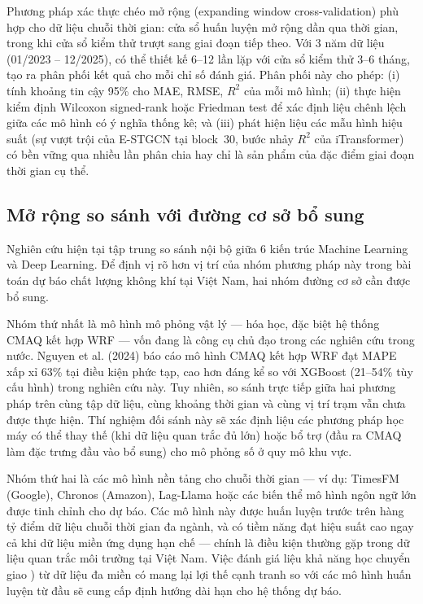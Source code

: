 Phương pháp xác thực chéo mở rộng (expanding window cross-validation) phù hợp cho dữ liệu chuỗi thời gian: cửa sổ huấn luyện mở rộng dần qua thời gian, trong khi cửa sổ kiểm thử trượt sang giai đoạn tiếp theo. Với 3 năm dữ liệu (01/2023 -- 12/2025), có thể thiết kế 6--12 lần lặp với cửa sổ kiểm thử 3--6 tháng, tạo ra phân phối kết quả cho mỗi chỉ số đánh giá. Phân phối này cho phép: (i) tính khoảng tin cậy 95\% cho MAE, RMSE, $R^2$ của mỗi mô hình; (ii) thực hiện kiểm định Wilcoxon signed-rank hoặc Friedman test để xác định liệu chênh lệch giữa các mô hình có ý nghĩa thống kê; và (iii) phát hiện liệu các mẫu hình hiệu suất (sự vượt trội của E-STGCN tại block~30, bước nhảy $R^2$ của iTransformer) có bền vững qua nhiều lần phân chia hay chỉ là sản phẩm của đặc điểm giai đoạn thời gian cụ thể.

\subsection{Mở rộng so sánh với đường cơ sở bổ sung}

Nghiên cứu hiện tại tập trung so sánh nội bộ giữa 6 kiến trúc Machine Learning và Deep Learning. Để định vị rõ hơn vị trí của nhóm phương pháp này trong bài toán dự báo chất lượng không khí tại Việt Nam, hai nhóm đường cơ sở cần được bổ sung.

Nhóm thứ nhất là mô hình mô phỏng vật lý --- hóa học, đặc biệt hệ thống CMAQ kết hợp WRF --- vốn đang là công cụ chủ đạo trong các nghiên cứu trong nước. Nguyen et al. (2024) báo cáo mô hình CMAQ kết hợp WRF đạt MAPE xấp xỉ 63\% tại điều kiện phức tạp, cao hơn đáng kể so với XGBoost (21--54\% tùy cấu hình) trong nghiên cứu này. Tuy nhiên, so sánh trực tiếp giữa hai phương pháp trên cùng tập dữ liệu, cùng khoảng thời gian và cùng vị trí trạm vẫn chưa được thực hiện. Thí nghiệm đối sánh này sẽ xác định liệu các phương pháp học máy có thể thay thế (khi dữ liệu quan trắc đủ lớn) hoặc bổ trợ (đầu ra CMAQ làm đặc trưng đầu vào bổ sung) cho mô phỏng số ở quy mô khu vực.

Nhóm thứ hai là các mô hình nền tảng cho chuỗi thời gian --- ví dụ: TimesFM (Google), Chronos (Amazon), Lag-Llama hoặc các biến thể mô hình ngôn ngữ lớn được tinh chỉnh cho dự báo. Các mô hình này được huấn luyện trước trên hàng tỷ điểm dữ liệu chuỗi thời gian đa ngành, và có tiềm năng đạt hiệu suất cao ngay cả khi dữ liệu miền ứng dụng hạn chế --- chính là điều kiện thường gặp trong dữ liệu quan trắc môi trường tại Việt Nam. Việc đánh giá liệu khả năng học chuyển giao ) từ dữ liệu đa miền có mang lại lợi thế cạnh tranh so với các mô hình huấn luyện từ đầu sẽ cung cấp định hướng dài hạn cho hệ thống dự báo.

